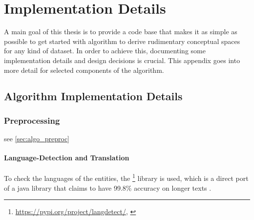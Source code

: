 




\chapter{Implementation Details} %

A main goal of this thesis is to provide a code base that makes it as simple as possible to get started with  algorithm to derive rudimentary conceptual spaces for any kind of dataset. In order to achieve this, documenting some implementation details and design decisions is crucial.
This appendix goes into more detail for selected components of the algorithm.

\label{AppendixB} 

\section{Algorithm Implementation Details}

\subsection*{Preprocessing}

see \autoref{sec:algo_preproc}

\subsubsection*{Language-Detection and Translation}
\label{ap:translating}

To check the languages of the entities, the \footnote{\url{https://pypi.org/project/langdetect/}, \textcite{nakatani2010langdetect}} library is used, which is a direct port of a java library that claims to have 99.8\% accuracy on longer texts \cite{nakatani2010langdetect}. 
\newline

